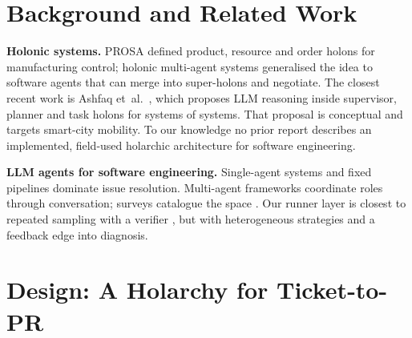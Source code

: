 \documentclass[conference]{IEEEtran}
\begin{document}
\section{Background and Related Work}
\label{sec:related}

\textbf{Holonic systems.} PROSA \cite{vanbrussel1998prosa} defined product,
resource and order holons for manufacturing control; holonic multi-agent
systems \cite{gerber1999holonic,giret2004holons} generalised the idea to
software agents that can merge into super-holons and negotiate. The closest
recent work is Ashfaq et~al.\ \cite{ashfaq2025holonic}, which proposes LLM
reasoning inside supervisor, planner and task holons for systems of systems.
That proposal is conceptual and targets smart-city mobility. To our
knowledge no prior report describes an implemented, field-used holarchic
architecture for software engineering.

\textbf{LLM agents for software engineering.} Single-agent systems
\cite{yang2024sweagent,wang2025openhands,zhang2024autocoderover} and fixed
pipelines \cite{xia2024agentless} dominate issue resolution. Multi-agent
frameworks \cite{hong2024metagpt,qian2024chatdev,wu2023autogen} coordinate
roles through conversation; surveys catalogue the space
\cite{he2024lmasurvey,liu2024agentsurvey}. Our runner layer is closest to
repeated sampling with a verifier \cite{brown2024monkeys,chen2023codet}, but
with heterogeneous strategies and a feedback edge into diagnosis.

\section{Design: A Holarchy for Ticket-to-PR}
\label{sec:design}
\end{document}

